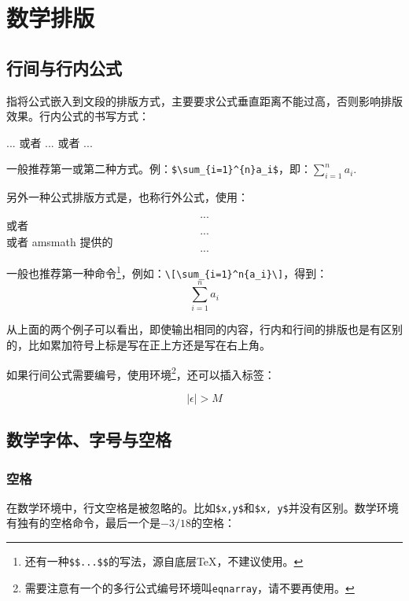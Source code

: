 \chapter{数学排版}
\section{行间与行内公式}
指将公式嵌入到文段的排版方式，主要要求公式垂直距离不能过高，否则影响排版效果。行内公式的书写方式：
\begin{latex}
$...$ 或者 \(...\) 或者 \begin{math}...\end{math}
\end{latex}

一般推荐第一或第二种方式。例：\verb|$\sum_{i=1}^{n}a_i$|，即：$\sum_{i=1}^{n}a_i$.

另外一种公式排版方式是，也称行外公式，使用：
\begin{latex}
\[...\] 或者 \begin{displaymath}...\end{displaymath}
或者 amsmath 提供的 \begin{equation*}...\end{equation*}
\end{latex}

一般也推荐第一种命令\footnote{还有一种\texttt{\$\$...\$\$}的写法，源自底层\TeX，不建议使用。}，例如：\verb|\[\sum_{i=1}^n{a_i}\]|，得到：
\[\sum_{i=1}^{n}a_i\]

从上面的两个例子可以看出，即使输出相同的内容，行内和行间的排版也是有区别的，比如累加符号上标是写在正上方还是写在右上角。

如果行间公式需要编号，使用环境\footnote{需要注意有一个的多行公式编号环境叫\texttt{eqnarray}，请不要再使用。}，还可以插入标签：

\begin{codeshow}
\begin{equation}
\label{eq:NoExample}
  |\epsilon|>M
\end{equation}
\end{codeshow}

\section{数学字体、字号与空格}
\label{sec:mathfont}
\subsection{空格}
在数学环境中，行文空格是被忽略的。比如\verb|$x,y$|和\verb|$x, y$|并没有区别。数学环境有独有的空格命令，最后一个是$-3/18$的空格：

